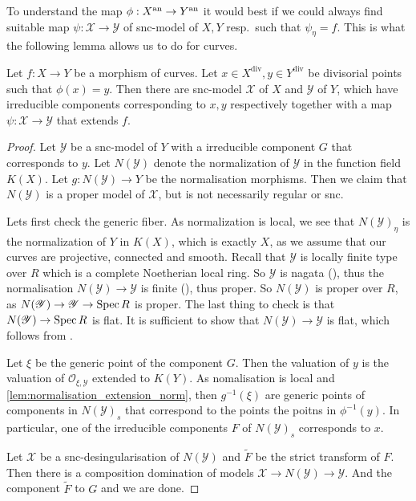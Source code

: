 To understand the map $\phi: X{}^{\text{an}} \to Y{}^{\text{an}}$ it would best if we could always find suitable map $\psi: \mathscr X \to \mathscr Y$ of snc-model of $X, Y$ resp.\ such that $\psi_\eta = f$. This is what the following lemma allows us to do for curves. 
\begin{lemma}\label{lem:snc_models_morphism_curves}
	Let $f: X \to Y$ be a morphism of curves. 
	Let $x \in X^{\text{div}}, y \in Y^{\text{div}}$ be divisorial points such that $\phi(x) = y$. 
	Then there are snc-model $\mathscr X$ of $X$ and $\mathscr Y$ of $Y$, which have irreducible components corresponding to $x, y$ respectively together with a map $\psi: \mathscr X \to \mathscr Y$ that extends $f$. 
\end{lemma} 
\begin{proof}
	Let $\mathscr Y$ be a snc-model of $Y$ with a irreducible component $G$ that corresponds to $y$. 
	Let $N(\mathscr Y)$ denote the normalization of $\mathscr Y$ in the function field $K(X)$. 
	Let $g: N(\mathscr Y) \to Y$ be the normalisation morphisms. 
	Then we claim that $N(\mathscr Y)$ is a proper model of $\mathscr X$, but is not necessarily regular or snc. 
	
	Lets first check the generic fiber.
	As normalization is local, we see that  $N(\mathscr Y)_\eta$ is the normalization of $Y$ in $K(X)$, which is exactly $X$, as we assume that our curves are projective, connected and smooth. 
	Recall that $\mathscr Y$ is locally finite type over $R$ which is a complete Noetherian local ring. 
	So $\mathscr Y$ is nagata (), thus the normalisation $N(\mathscr Y) \to \mathscr Y$  is finite (), thus proper. 
	So $N(\mathscr Y)$ is proper over $R$, as $N(\mathscr Y) \to \mathscr Y \to \operatorname{Spec} R$ is proper. 
	The last thing to check is that $N(\mathscr Y) \to \operatorname{Spec} R$ is flat. It is sufficient to show that $N(\mathscr Y) \to \mathscr Y$ is flat, which follows from \cite[thm.\ 18.H]{matsumuraCommutativeAlgebra1980}. 
	
	Let $\xi$ be the generic point of the component $G$. 
	Then the valuation of $y$ is the valuation of $\mathcal{O}_{\xi, \mathscr Y}$ extended to $K\left( Y \right) $. 
	As nomalisation is local and \cref{lem:normalisation_extension_norm}, then $g^{-1}(\xi)$ are generic points of components in $N(\mathscr Y)_s$ that correspond to the points the poitns in $\phi^{-1}(y)$. 
	In particular, one of the irreducible components $F$ of $N(\mathscr Y)_s$ corresponds to $x$. 

	Let $\mathscr X$ be a snc-desingularisation of $N(\mathscr Y)$ and $\tilde F$ be the strict transform of $F$. 
	Then there is a composition domination of models  $\mathscr X \to  N(\mathscr Y) \to \mathscr Y$.
	And the component $\tilde F$ to $G$ and we are done. 
\end{proof}

